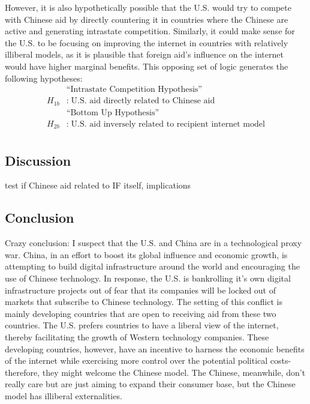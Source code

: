 However, it is also hypothetically possible that the U.S. would try to compete with Chinese aid by directly countering it in countries where the Chinese are active and generating intrastate competition. Similarly, it could make sense for the U.S. to be focusing on improving the internet in countries with relatively illiberal models, as it is plausible that foreign aid's influence on the internet would have higher marginal benefits. This opposing set of logic generates the following hypotheses:
\begin{align*}
    &\text{``Intrastate Competition Hypothesis''}\\
    H_{1b}&:\;\text{U.S. aid directly related to Chinese aid}\\
    &\text{``Bottom Up Hypothesis''}\\
    H_{2b}&:\;\text{U.S. aid inversely related to recipient internet model}\\
\end{align*}

\subsection*{Discussion}
test if Chinese aid related to IF itself, implications

\subsection*{Conclusion}
Crazy conclusion: I suspect that the U.S. and China are in a technological proxy war. China, in an effort to boost its global influence and economic growth, is attempting to build digital infrastructure around the world and encouraging the use of Chinese technology. In response, the U.S. is bankrolling it's own digital infrastructure projects out of fear that its companies will be locked out of markets that subscribe to Chinese technology. The setting of this conflict is mainly developing countries that are open to receiving aid from these two countries. The U.S. prefers countries to have a liberal view of the internet, thereby facilitating the growth of Western technology companies. These developing countries, however, have an incentive to harness the economic benefits of the internet while exercising more control over the potential political costs- therefore, they might welcome the Chinese model. The Chinese, meanwhile, don't really care but are just aiming to expand their consumer base, but the Chinese model has illiberal externalities.

